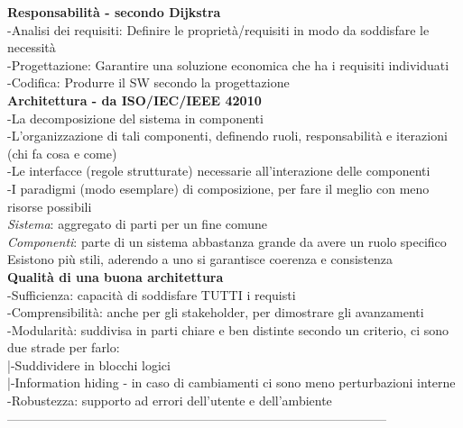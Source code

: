 \documentclass{article}
\begin{document}
		\textbf{Responsabilità - secondo Dijkstra}\\
		-Analisi dei requisiti: Definire le proprietà/requisiti in modo da soddisfare le necessità\\
		-Progettazione: Garantire una soluzione economica che ha i requisiti individuati\\
		-Codifica: Produrre il SW secondo la progettazione\\
		
		\textbf{Architettura - da ISO/IEC/IEEE 42010}\\
		-La decomposizione del sistema in componenti\\
		-L'organizzazione di tali componenti, definendo ruoli, responsabilità e iterazioni (chi fa cosa e come)\\
		-Le interfacce (regole strutturate) necessarie all'interazione delle componenti\\
		-I paradigmi (modo esemplare) di composizione, per fare il meglio con meno risorse possibili\\
		
		\textit{Sistema}: aggregato di parti per un fine comune\\
		\textit{Componenti}: parte di un sistema abbastanza grande da avere un ruolo specifico\\
		
		Esistono più stili, aderendo a uno si garantisce coerenza e consistenza\\
		
		\textbf{Qualità di una buona architettura}\\
		-Sufficienza: capacità di soddisfare TUTTI i requisti\\
		-Comprensibilità: anche per gli stakeholder, per dimostrare gli avanzamenti\\
		-Modularità: suddivisa in parti chiare e ben distinte secondo un criterio, ci sono due strade per farlo:\\
		|-Suddividere in blocchi logici\\
		|-Information hiding - in caso di cambiamenti ci sono meno perturbazioni interne\\
		-Robustezza: supporto ad errori dell'utente e dell'ambiente\\
		
		------------------------------------------------------------------------------------------
		\\
		
\end{document}
